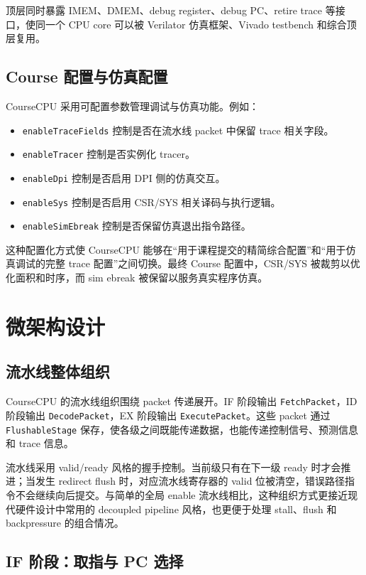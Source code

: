 \documentclass[UTF8,a4paper,12pt]{ctexrep}
\begin{document}
顶层同时暴露 IMEM、DMEM、debug register、debug PC、retire trace 等接口，使同一个 CPU core 可以被 Verilator 仿真框架、Vivado testbench 和综合顶层复用。

\section{Course 配置与仿真配置}

CourseCPU 采用可配置参数管理调试与仿真功能。例如：

\begin{itemize}
  \item \texttt{enableTraceFields} 控制是否在流水线 packet 中保留 trace 相关字段。
  \item \texttt{enableTracer} 控制是否实例化 tracer。
  \item \texttt{enableDpi} 控制是否启用 DPI 侧的仿真交互。
  \item \texttt{enableSys} 控制是否启用 CSR/SYS 相关译码与执行逻辑。
  \item \texttt{enableSimEbreak} 控制是否保留仿真退出指令路径。
\end{itemize}

这种配置化方式使 CourseCPU 能够在“用于课程提交的精简综合配置”和“用于仿真调试的完整 trace 配置”之间切换。最终 Course 配置中，CSR/SYS 被裁剪以优化面积和时序，而 sim ebreak 被保留以服务真实程序仿真。

\chapter{微架构设计}

\section{流水线整体组织}

CourseCPU 的流水线组织围绕 packet 传递展开。IF 阶段输出 \texttt{FetchPacket}，ID 阶段输出 \texttt{DecodePacket}，EX 阶段输出 \texttt{ExecutePacket}。这些 packet 通过 \texttt{FlushableStage} 保存，使各级之间既能传递数据，也能传递控制信号、预测信息和 trace 信息。

流水线采用 valid/ready 风格的握手控制。当前级只有在下一级 ready 时才会推进；当发生 redirect flush 时，对应流水线寄存器的 valid 位被清空，错误路径指令不会继续向后提交。与简单的全局 enable 流水线相比，这种组织方式更接近现代硬件设计中常用的 decoupled pipeline 风格，也更便于处理 stall、flush 和 backpressure 的组合情况。

\section{IF 阶段：取指与 PC 选择}
\end{document}
